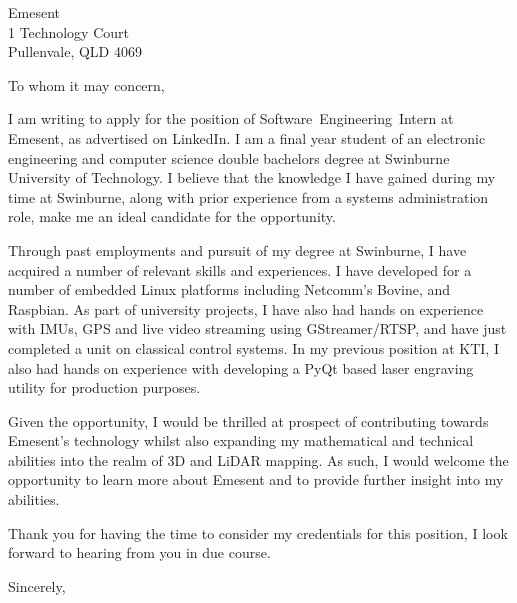 \documentclass[
    backaddress=false,
    foldmarks=false,
    fromalign=right,
    fromrule,
    fromphone,
    fromemail,
    parskip=half,
    refline=nodate
]{scrlttr2}
\begin{document}
    


    \renewcommand*\raggedsignature{\raggedright}

    \begin{letter}{%
        Emesent            \\
        1 Technology Court \\
        Pullenvale, QLD 4069}
        \opening{To whom it may concern,}
        I am writing to apply for the position of Software~Engineering~Intern at Emesent, as advertised on LinkedIn. I am a final year student of an electronic engineering and computer science double bachelors degree at Swinburne University of Technology. I believe that the knowledge I have gained during my time at Swinburne, along with prior experience from a systems administration role, make me an ideal candidate for the opportunity.

        Through past employments and pursuit of my degree at Swinburne, I have acquired a number of relevant skills and experiences. I have developed for a number of embedded Linux platforms including Netcomm's Bovine, and Raspbian. As part of university projects, I have also had hands on experience with IMUs, GPS and live video streaming using GStreamer/RTSP, and have just completed a unit on classical control systems. In my previous position at KTI, I also had hands on experience with developing a PyQt based laser engraving utility for production purposes.

        Given the opportunity, I would be thrilled at prospect of contributing towards Emesent's technology whilst also expanding my mathematical and technical abilities into the realm of 3D and LiDAR mapping. As such, I would welcome the opportunity to learn more about Emesent and to provide further insight into my abilities.

        Thank you for having the time to consider my credentials for this position, I look forward to hearing from you in due course.

        \closing{Sincerely,}
    \end{letter}
\end{document}
